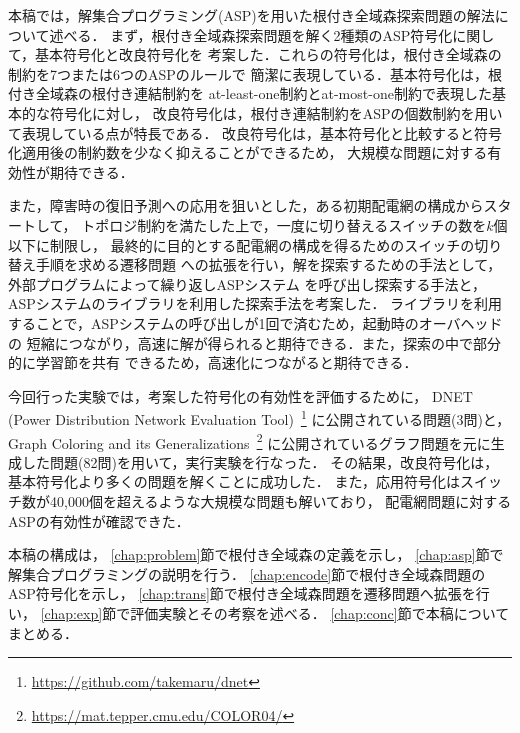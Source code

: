 本稿では，解集合プログラミング(ASP)を用いた根付き全域森探索問題の解法について述べる．
まず，根付き全域森探索問題を解く2種類のASP符号化に関して，基本符号化と改良符号化を
考案した．これらの符号化は，根付き全域森の制約を7つまたは6つのASPのルールで
簡潔に表現している．基本符号化は，根付き全域森の根付き連結制約を
at-least-one制約とat-most-one制約で表現した基本的な符号化に対し，
改良符号化は，根付き連結制約をASPの個数制約を用いて表現している点が特長である．
改良符号化は，基本符号化と比較すると符号化適用後の制約数を少なく抑えることができるため，
大規模な問題に対する有効性が期待できる．

また，障害時の復旧予測への応用を狙いとした，ある初期配電網の構成からスタートして，
トポロジ制約を満たした上で，一度に切り替えるスイッチの数を$k$個以下に制限し，
最終的に目的とする配電網の構成を得るためのスイッチの切り替え手順を求める遷移問題
への拡張を行い，解を探索するための手法として，外部プログラムによって繰り返しASPシステム
を呼び出し探索する手法と，ASPシステム\clingo のライブラリを利用した探索手法を考案した．
ライブラリを利用することで，ASPシステムの呼び出しが1回で済むため，起動時のオーバヘッドの
短縮につながり，高速に解が得られると期待できる．また，探索の中で部分的に学習節を共有
できるため，高速化につながると期待できる．

今回行った実験では，考案した符号化の有効性を評価するために，
DNET (Power Distribution Network Evaluation Tool)~\footnote{%
\url{https://github.com/takemaru/dnet}}
に公開されている問題(3問)と，
Graph Coloring and its Generalizations~\footnote{%
\url{https://mat.tepper.cmu.edu/COLOR04/}}
に公開されているグラフ問題を元に生成した問題(82問)を用いて，実行実験を行なった．
その結果，改良符号化は，基本符号化より多くの問題を解くことに成功した．
また，応用符号化はスイッチ数が40,000個を超えるような大規模な問題も解いており，
配電網問題に対するASPの有効性が確認できた．

本稿の構成は，
\ref{chap:problem}節で根付き全域森の定義を示し，
\ref{chap:asp}節で解集合プログラミングの説明を行う．
\ref{chap:encode}節で根付き全域森問題のASP符号化を示し，
\ref{chap:trans}節で根付き全域森問題を遷移問題へ拡張を行い，
\ref{chap:exp}節で評価実験とその考察を述べる．
\ref{chap:conc}節で本稿についてまとめる．


